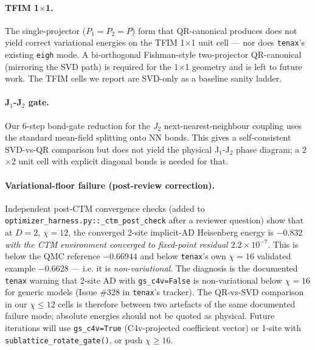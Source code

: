 \documentclass[aps,prresearch,reprint,amsmath,amssymb,floatfix]{revtex4-2}
\newcommand{\tenax}{\texttt{tenax}}
\newcommand{\code}[1]{\texttt{#1}}
\begin{document}
\paragraph{TFIM 1$\times$1.} The single-projector ($P_1=P_2=P$) form
that QR-canonical produces does not yield correct variational energies
on the TFIM 1$\times$1 unit cell --- nor does \tenax's existing
\code{eigh} mode. A bi-orthogonal Fishman-style two-projector
QR-canonical (mirroring the SVD path) is required for the 1$\times$1
geometry and is left to future work. The TFIM cells we report are
SVD-only as a baseline sanity ladder.

\paragraph{J$_1$-J$_2$ gate.} Our 6-step bond-gate reduction for the
$J_2$ next-nearest-neighbour coupling uses the standard mean-field
splitting onto NN bonds. This gives a self-consistent SVD-vs-QR
comparison but does not yield the physical J$_1$-J$_2$ phase diagram;
a 2$\times$2 unit cell with explicit diagonal bonds is needed for that.

\paragraph{Variational-floor failure (post-review correction).}
Independent post-CTM convergence checks (added to
\code{optimizer\_harness.py::\_ctm\_post\_check} after a reviewer
question) show that at $D=2$, $\chi=12$, the converged 2-site
implicit-AD Heisenberg energy is $-0.832$ \emph{with the CTM
environment converged to fixed-point residual $2.2\times 10^{-7}$}.
This is below the QMC reference $-0.66944$ and below \tenax{}'s own
$\chi=16$ validated example $-0.6628$ --- i.e. it is
\emph{non-variational}. The diagnosis is the documented \tenax{}
warning that 2-site AD with \code{gs\_c4v=False} is non-variational
below $\chi=16$ for generic models (Issue \#328 in \tenax{}'s
tracker). The QR-vs-SVD comparison in our $\chi\le 12$ cells is
therefore between two artefacts of the same documented failure mode;
absolute energies should not be quoted as physical. Future iterations
will use \code{gs\_c4v=True} (C4v-projected coefficient vector) or
1-site with \code{sublattice\_rotate\_gate()}, or push $\chi\ge 16$.
\end{document}
